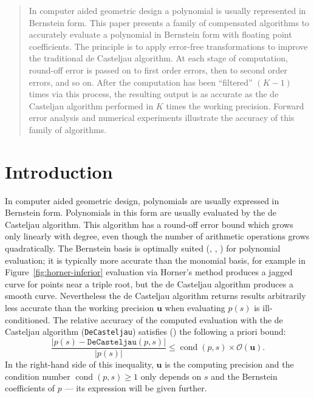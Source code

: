 \documentclass[letterpaper,10pt]{article}
\theoremstyle{definition}
\newcommand{\cond}[1]{\operatorname{cond}\left(#1\right)}
\newcommand{\mach}{\mathbf{u}}
\begin{document}
\begin{abstract}
In computer aided geometric design a polynomial is usually represented in
Bernstein form. This paper presents a family of compensated algorithms to
accurately evaluate a polynomial in Bernstein form with floating point
coefficients. The principle is to apply error-free transformations to
improve the traditional de Casteljau algorithm. At each stage of computation,
round-off error is passed on to first order errors, then to second order
errors, and so on. After the computation has been ``filtered'' \((K - 1)\)
times via this process, the resulting output is as accurate as the de Casteljau
algorithm performed in \(K\) times the working precision. Forward error
analysis and numerical experiments illustrate the accuracy of this family
of algorithms.
\end{abstract}

\tableofcontents

\section{Introduction}

In computer aided geometric design, polynomials are usually expressed in
Bernstein form. Polynomials in this form are usually evaluated by the
de Casteljau algorithm. This algorithm has a round-off error bound
which grows only linearly with degree, even though the number of
arithmetic operations grows quadratically. The Bernstein basis is
optimally suited (\cite{Farouki1987}, \cite{Delgado2015}, \cite{Mainar2005})
for polynomial evaluation; it is
typically more accurate than the monomial basis, for example in
Figure~\ref{fig:horner-inferior} evaluation via Horner's method produces
a jagged curve for points near a triple root, but the de Casteljau algorithm
produces a smooth curve. Nevertheless the de Casteljau
algorithm returns results arbitrarily less accurate than the working
precision \(\mach\) when evaluating \(p(s)\) is ill-conditioned.
The relative accuracy of the computed
evaluation with the de Casteljau algorithm (\texttt{DeCasteljau}) satisfies
(\cite{Mainar1999}) the following a priori bound:
\begin{equation}\label{de-casteljau-error}
  \frac{\left|p(s) - \mathtt{DeCasteljau}(p, s)\right|}{\left|p(s)\right|} \leq
  \cond{p, s} \times \mathcal{O}(\mach).
\end{equation}
In the right-hand side of this inequality, \(\mach\) is the computing
precision and the condition number \(\cond{p, s} \geq 1\) only depends
on \(s\) and the Bernstein coefficients of \(p\) --- its expression will
be given further.
\end{document}
